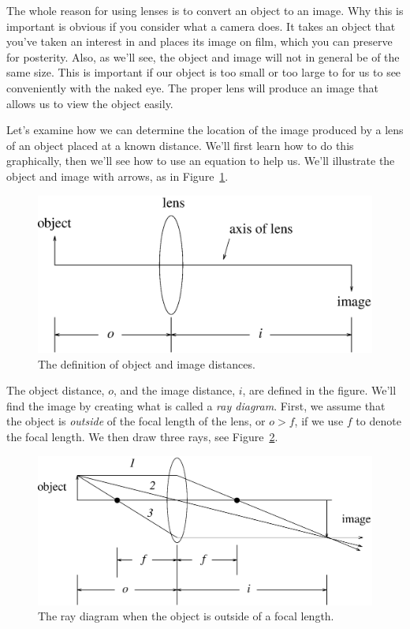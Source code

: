 The whole reason for using lenses is to convert an object to an image. Why 
this is important is obvious if you consider what a camera does. It takes an 
object that you've taken an interest in and places its image on film, which 
you can preserve for posterity.  Also, as we'll see, the object and image will 
not in general be of the same size. This is important if our object is too 
small or too large to for us to see conveniently with the naked eye.  The 
proper lens will produce an image that allows us to view the object easily. 

Let's examine how we can determine the location of the image produced by a 
lens of an object placed at a known distance.  We'll first learn how to do 
this graphically, then we'll see how to use an equation to help us.  We'll 
illustrate the object and image with arrows, as in 
Figure~\ref{fig:opt:objandim}.
\begin{figure}
\centering 
\epsfxsize=11cm \includegraphics[scale=0.6]{9_imaging/objandim.eps}
\caption{The definition of object and image distances.}
\label{fig:opt:objandim}
\end{figure}
The object distance, $o$, and the image distance, $i$, are defined in the 
figure.  We'll find the image by creating what is called a {\it ray diagram}.
First, we assume that the object is {\it outside} of the focal length of the
lens, or $o>f$, if we use $f$ to denote the focal length. We then draw three
rays, see Figure~\ref{fig:opt:outsidef}.   
\begin{figure}
\centering 
\epsfxsize=13cm \includegraphics[scale=0.6]{9_imaging/outsidef.eps}
\caption{The ray diagram when the object is outside of a focal length.}
\label{fig:opt:outsidef}
\end{figure}
